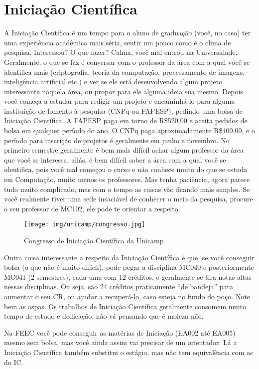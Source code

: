 
\section{Iniciação Científica}

A Iniciação Científica é um tempo para o aluno de graduação (você, no caso) ter
uma experiência acadêmica mais séria, sentir um pouco como é o clima de
pesquisa. Interessou? O que fazer? Calma, você mal entrou na Universidade.
Geralmente, o que se faz é conversar com o professor da área com a qual você se
identifica mais (criptografia, teoria da computação, processamento de imagens,
inteligência artificial etc.) e ver se ele está desenvolvendo algum projeto
interessante naquela área, ou propor para ele alguma ideia sua mesmo.  Depois
você começa a estudar para redigir um projeto e encaminhá-lo para alguma
instituição de fomento à pesquisa (CNPq ou FAPESP), pedindo uma bolsa de
Iniciação Científica. A FAPESP paga em torno de R\$520,00 e aceita pedidos de
bolsa em qualquer período do ano. O CNPq paga aproximadamente R\$400,00, e o
período para inscrição de projetos é geralmente em junho e novembro. No primeiro
semestre geralmente é bem mais difícil achar algum professor da área que você se
interessa, aliás, é bem difícil saber a área com a qual você se identifica, pois
você mal começou o curso e não conhece muito do que se estuda em Computação,
muito menos os professores. Mas tenha paciência, agora parece tudo muito
complicado, mas com o tempo as coisas vão ficando mais simples. Se você
realmente tiver uma sede insaciável de conhecer o meio da pesquisa, procure o
seu professor de MC102, ele pode te orientar a respeito.

\begin{figure}[h!]
    \centering
    \texttt{[image: img/unicamp/congresso.jpg]}
    \caption{Congresso de Iniciação Científica da Unicamp}
\end{figure}

Outra coisa interessante a respeito da Iniciação Científica é que, se você
conseguir bolsa (o que não é muito difícil), pode pegar a disciplina MC040 e
posteriormente MC041 (2 semestres), cada uma com 12 créditos, e geralmente se
tira notas altas nessas disciplinas. Ou seja, são 24 créditos praticamente ``de
bandeja'' para aumentar o seu CR, ou ajudar a recuperá-lo, caso esteja no fundo
do poço. Note bem as aspas. Os trabalhos de Iniciação Científica geralmente
consomem muito tempo de estudo e dedicação, não vá pensando que é moleza não.

Na FEEC você pode conseguir as matérias de Iniciação (EA002 até EA005) mesmo sem
bolsa, mas você ainda assim vai precisar de um orientador. Lá a Iniciação
Científica também substitui o estágio, mas não tem equivalência com as do IC.
